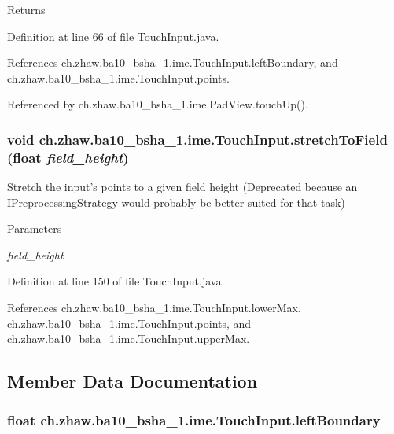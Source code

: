 \begin{DoxyReturn}{Returns}

\end{DoxyReturn}


Definition at line 66 of file TouchInput.java.

References ch.zhaw.ba10\_\-bsha\_\-1.ime.TouchInput.leftBoundary, and ch.zhaw.ba10\_\-bsha\_\-1.ime.TouchInput.points.

Referenced by ch.zhaw.ba10\_\-bsha\_\-1.ime.PadView.touchUp().\hypertarget{classch_1_1zhaw_1_1ba10__bsha__1_1_1ime_1_1TouchInput_ae2b9a9c1de66611330905b922310cc7c}{
\subsubsection[{stretchToField}]{\setlength{\rightskip}{0pt plus 5cm}void ch.zhaw.ba10\_\-bsha\_\-1.ime.TouchInput.stretchToField (float {\em field\_\-height})}}
\label{classch_1_1zhaw_1_1ba10__bsha__1_1_1ime_1_1TouchInput_ae2b9a9c1de66611330905b922310cc7c}
Stretch the input's points to a given field height (Deprecated because an \hyperlink{}{IPreprocessingStrategy} would probably be better suited for that task)


\begin{DoxyParams}{Parameters}
\item[{\em field\_\-height}]\end{DoxyParams}


Definition at line 150 of file TouchInput.java.

References ch.zhaw.ba10\_\-bsha\_\-1.ime.TouchInput.lowerMax, ch.zhaw.ba10\_\-bsha\_\-1.ime.TouchInput.points, and ch.zhaw.ba10\_\-bsha\_\-1.ime.TouchInput.upperMax.

\subsection{Member Data Documentation}
\hypertarget{classch_1_1zhaw_1_1ba10__bsha__1_1_1ime_1_1TouchInput_aaaec1a7c1eb29dde413a37e18fe9eaac}{
\subsubsection[{leftBoundary}]{\setlength{\rightskip}{0pt plus 5cm}float {\bf ch.zhaw.ba10\_\-bsha\_\-1.ime.TouchInput.leftBoundary}}}
\label{classch_1_1zhaw_1_1ba10__bsha__1_1_1ime_1_1TouchInput_aaaec1a7c1eb29dde413a37e18fe9eaac}


